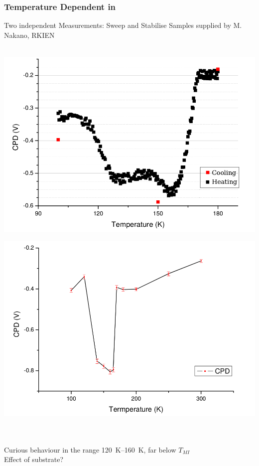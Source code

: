 \documentclass{beamer}
\begin{document}
\begin{frame}
\frametitle{Temperature Dependent \cpd{} in \wvadiox{}}
\begin{block}{Two independent Measurements: Sweep and Stabilise}
\centering
{\tiny Samples supplied by M. Nakano, RKIEN}\\[-10pt]\hrulefill\\[2pt]
\begin{minipage}{0.45\linewidth}
\centering
	\includegraphics[width=1\linewidth]{./figs/pres/vox1pres}
\end{minipage}
\hfill
\begin{minipage}{0.45\linewidth}
\centering
	\includegraphics[width=1\linewidth]{./figs/pres/vox2pres}
\end{minipage}\\[5pt]\hrulefill\\
Curious behaviour in the range \SIrange{120}{160}{\kelvin}, far below $T_{MI}$ \\
Effect of substrate?
\end{block}\end{frame}
\end{document}
